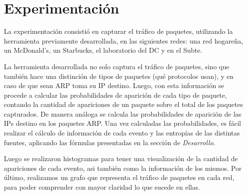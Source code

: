 \section{Experimentación}
La experimentación consistió en capturar el tráfico de paquetes, utilizando la herramienta previamente desarrollada, en las siguientes redes: una red hogareña, un McDonald's, un Starbucks, el laboratorio del DC y en el Subte.

La herramienta desarrollada no solo captura el tráfico de paquetes, sino que también hace una distinción de tipos de paquetes (qué protocolos usan), y en caso de que sean ARP toma su IP destino. Luego, con esta información se procede a calcular las probabilidades de aparición de cada tipo de paquete, contando la cantidad de apariciones de un paquete sobre el total de los paquetes capturados. De manera análoga se calcula las probabilidades de aparición de las IPs destino en los paquetes ARP. Una vez calculadas las probabilidades, es fácil realizar el cálculo de información de cada evento y las entropías de las distintas fuentes, aplicando las fórmulas presentadas en la sección de \textit{Desarrollo}.

Luego se realizaron histogramas para tener una visualización de la cantidad de apariciones de cada evento, asi también como la información de los mismos.
Por último, realizamos un grafo que representa el tráfico de paquetes en cada red, para poder comprender con mayor claridad lo que sucede en ellas.

\newpage


\newpage


\newpage


\newpage


\newpage


\newpage


